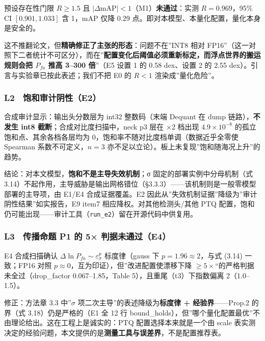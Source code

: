 预设存在性门限 \(R\ge 1.5\) 且
\(|\Delta\)mAP\(|<1\)（M1）\textbf{未通过}：实测 \(R=0.969\)，95\% CI
\([0.901, 1.033]\) 含 1，mAP 仅降 0.29
点。即对本模型、本量化配置，量化本身是安全的。

这不推翻论文，但\textbf{精确修正了主张的形态}：问题不在''INT8 相对
FP16''（这一对照下二者统计不可区分），而在''\textbf{配置变化后阈值必须重新标定，而浮点世界的搬运规则会把
\(P_{fa}\) 推高 3--300 倍}''（E5 设置 1 的 0.58 dex、设置 2 的 2.55
dex）。引言与实验章已按此表述；我们不把 E0 的 \(R<1\)
渲染成''量化危险''。

\subsubsection{L2　饱和审计阴性（E2）}\label{l2-ux9971ux548cux5ba1ux8ba1ux9634ux6027e2}

合成审计显示：输出头分数层为 int32 整数码（末端 Dequant 在 dump
链路），\textbf{不发生 int8 截断}；合成对比度扫描中，neck p3 层在 ×2
档出现 \(4.9\times10^{-8}\) 的孤立饱和点、其余各档各层均为
0，饱和率不随对比度档单调（数据近乎全零使 Spearman 系数不可定义，\(n=3\)
亦不足以立论）。板上未复现''饱和随海况上升''的趋势。

结论：对本文模型，\textbf{饱和不是主导失效机制}；σ
固定的部署实例中分母机制（式
3.14）不起作用，主导威胁是输出网格错位（§3.3.3）------该机制则是一般零模型部署的主导项，由
E1/E4 合成证据覆盖。E2
因此从''失效机制证据''降级为''审计阴性结果''如实报告，E9 item7
相应降权。对其他检测头/其他 PTQ
配置，饱和仍可能出现------审计工具（\texttt{run\_e2}）留在开源代码中供复用。

\subsubsection{L3　传播命题 P1 的 5×
判据未通过（E4）}\label{l3-ux4f20ux64adux547dux9898-p1-ux7684-5-ux5224ux636eux672aux901aux8fc7e4}

E4 合成扫描确认 \(\Delta\ln P_{fa}\sim\varepsilon_\sigma^{p}\)
标度律（gauss 下 \(p=1.96\approx2\)，与式 (3.14) 一致；FP16 对照
\(p\approx0\)，互为印证），但''改进配置使漂移下降
\(\ge5\times\)``的严格判据未全过（drop\_factor 0.067--1.85，Table
5），且重尾（t3）下指数偏离 2（1.0--1.5）。

修正：方法章 3.3 中''\(\sigma\) 项二次主导''的表述降级为\textbf{标度律 +
经验界}------Prop.2 的界（式 3.18）仍是严格的（E1 全 12 行
bound\_holds），但''哪个量化配置最优''不由理论给出。这在工程上是诚实的：PTQ
配置选择本来就是一个由 scale
表实测决定的经验问题，本文提供的是\textbf{测量工具与误差界}，不是配置推荐表。

